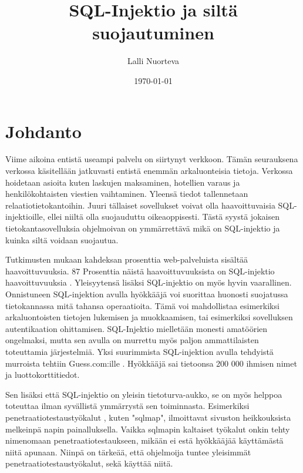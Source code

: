 \documentclass[finnish]{tktltiki2}
\title{SQL-Injektio ja siltä suojautuminen}
\author{Lalli Nuorteva}
\date{\today}
\theoremstyle{definition}
\theoremstyle{remark}
\begin{document}
	
	\frontmatter      %
	
	\maketitle        %
	
	\makeabstract
	
	\tableofcontents  %
	
	
	\mainmatter       %
	
	\section{Johdanto}
	Viime aikoina entistä useampi palvelu on siirtynyt verkkoon. Tämän seurauksena verkossa käsitellään jatkuvasti entistä enemmän arkaluonteisia tietoja. Verkossa hoidetaan asioita kuten laskujen maksaminen, hotellien varaus ja henkilökohtaisten viestien vaihtaminen. Yleensä tiedot tallennetaan relaatiotietokantoihin. Juuri tällaiset sovellukset voivat olla haavoittuvaisia SQL-injektioille, ellei niiltä olla suojauduttu oikeaoppisesti. Tästä syystä jokaisen tietokantasovelluksia ohjelmoivan on ymmärrettävä mikä on SQL-injektio ja kuinka siltä voidaan suojautua.
	
	Tutkimusten mukaan kahdeksan prosenttia web-palveluista sisältää haavoittuvuuksia.  87 Prosenttia näistä haavoittuvuuksista on SQL-injektio haavoittuvuuksia \cite{detection}. Yleisyytensä lisäksi SQL-injektio on myös hyvin vaarallinen. Onnistuneen SQL-injektion avulla hyökkääjä voi suorittaa huonosti suojatussa tietokannassa mitä tahansa operaatioita. Tämä voi mahdollistaa esimerkiksi arkaluontoisten tietojen lukemisen ja muokkaamisen, tai esimerkiksi sovelluksen autentikaation ohittamisen. SQL-Injektio mielletään monesti amatöörien ongelmaksi, mutta sen avulla on murrettu myös paljon ammattilaisten toteuttamia järjestelmiä. Yksi suurimmista SQL-injektion avulla tehdyistä murroista tehtiin Guess.com:ille \cite{guess}. Hyökkääjä sai tietoonsa 200 000 ihmisen nimet ja luottokorttitiedot.
	
	Sen lisäksi että SQL-injektio on yleisin tietoturva-aukko, se on myös helppoa toteuttaa ilman syvällistä ymmärrystä sen toiminnasta. Esimerkiksi penetraatiotestaustyökalut , kuten "sqlmap"\space, ilmoittavat sivuston heikkouksista melkeinpä napin painalluksella. Vaikka sqlmapin kaltaiset työkalut onkin tehty nimenomaan penetraatiotestaukseen, mikään ei estä hyökkääjää käyttämästä niitä apunaan. Niinpä on tärkeää, että ohjelmoija tuntee yleisimmät penetraatiotestaustyökalut, sekä käyttää niitä.
	
\end{document}
